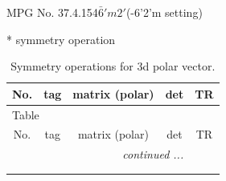 \documentclass[fleqn,8pt]{jsarticle}
\begin{document}
\setcounter{MaxMatrixCols}{32}

\renewcommand{\tablename}{Table~}
\renewcommand{\figurename}{Figure~}
\begin{center}
\LARGE
MPG No. 37.4.154\quad$\bar{6}'m2'$\quad(-6'2'm setting)
\end{center}
* symmetry operation
\renewcommand{\arraystretch}{1.3}
\begin{longtable}{ccccc}
\caption{Symmetry operations for 3d polar vector.}
 \\
 \hline \hline
No. & tag & matrix (polar) & det & TR \\ \hline \endfirsthead

\multicolumn{4}{l}{\tablename\ \thetable{}} \\
 \hline \hline
No. & tag & matrix (polar) & det & TR \\ \hline \endhead

 \hline \hline
\multicolumn{4}{r}{\footnotesize\it continued ...} \\ \endfoot

 \hline \hline
\multicolumn{4}{r}{} \\ \endlastfoot


\end{longtable}
\end{document}
